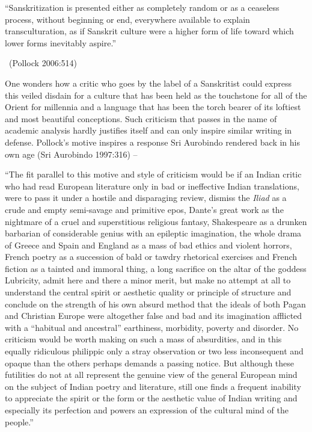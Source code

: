 \begin{myquote}
“Sanskritization is presented either as completely random or as a ceaseless process, without beginning or end, everywhere available to explain transculturation, as if Sanskrit culture were a higher form of life toward which lower forms inevitably aspire.” 

~\hfill (Pollock 2006:514)
\end{myquote}

One wonders how a critic who goes by the label of a Sanskritist could express this veiled disdain for a culture that has been held as the touchstone for all of the Orient for millennia and a language that has been the torch bearer of its loftiest and most beautiful conceptions. Such criticism that passes in the name of academic analysis hardly justifies itself and can only inspire similar writing in defense. Pollock’s motive inspires a response Sri Aurobindo rendered back in his own age (Sri Aurobindo 1997:316) –

\begin{myquote}
“The fit parallel to this motive and style of criticism would be if an Indian critic who had read European literature only in bad or ineffective Indian translations, were to pass it under a hostile and disparaging review, dismiss the \textit{Iliad} as a crude and empty semi-savage and primitive epos, Dante’s great work as the nightmare of a cruel and superstitious religious fantasy, Shakespeare as a drunken barbarian of considerable genius with an epileptic imagination, the whole drama of Greece and Spain and England as a mass of bad ethics and violent horrors, French poetry as a succession of bald or tawdry rhetorical exercises and French fiction as a tainted and immoral thing, a long sacrifice on the altar of the goddess Lubricity, admit here and there a minor merit, but make no attempt at all to understand the central spirit or aesthetic quality or principle of structure and conclude on the strength of his own absurd method that the ideals of both Pagan and Christian Europe were altogether false and bad and its imagination afflicted with a “habitual and ancestral” earthiness, morbidity, poverty and disorder. No criticism would be worth making on such a mass of absurdities, and in this equally ridiculous philippic only a stray observation or two less inconsequent and opaque than the others perhaps demands a passing notice. But although these futilities do not at all represent the genuine view of the general European mind on the subject of Indian poetry and literature, still one finds a frequent inability to appreciate the spirit or the form or the aesthetic value of Indian writing and especially its perfection and powers an expression of the cultural mind of the people.”
\end{myquote}

